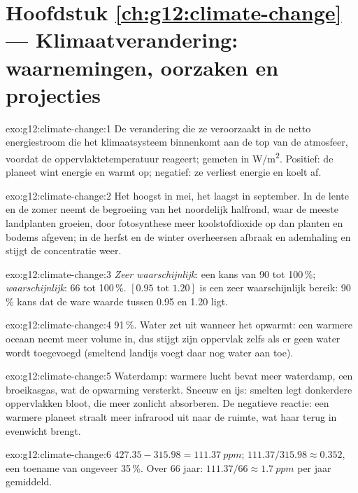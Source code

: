 \section*{Hoofdstuk \ref{ch:g12:climate-change} --- Klimaatverandering: waarnemingen, oorzaken en projecties}

\begin{solution}{exo:g12:climate-change:1}
De verandering die ze veroorzaakt in de netto energiestroom die het klimaatsysteem
binnenkomt aan de top van de atmosfeer, voordat de oppervlaktetemperatuur reageert;
gemeten in \unit{W/m^2}. Positief: de planeet wint energie en warmt op;
negatief: ze verliest energie en koelt af.
\end{solution}

\begin{solution}{exo:g12:climate-change:2}
Het hoogst in mei, het laagst in september. In de lente en de zomer neemt de begroeiing
van het noordelijk halfrond, waar de meeste landplanten groeien, door fotosynthese meer
koolstofdioxide op dan planten en bodems afgeven; in de herfst
en de winter overheersen afbraak en ademhaling en stijgt de concentratie weer.
\end{solution}

\begin{solution}{exo:g12:climate-change:3}
\emph{Zeer waarschijnlijk}: een kans van 90 tot 100\,\%; \emph{waarschijnlijk}: 66 tot
100\,\%. $[0.95 \text{ tot } 1.20]$ is een zeer waarschijnlijk bereik: 90\,\% kans dat
de ware waarde tussen 0.95 en 1.20 ligt.
\end{solution}

\begin{solution}{exo:g12:climate-change:4}
91\,\%. Water zet uit wanneer het opwarmt: een warmere oceaan neemt meer volume in, dus
stijgt zijn oppervlak zelfs als er geen water wordt toegevoegd (smeltend landijs voegt daar
nog water aan toe).
\end{solution}

\begin{solution}{exo:g12:climate-change:5}
Waterdamp: warmere lucht bevat meer waterdamp, een broeikasgas, wat de opwarming
versterkt. Sneeuw en ijs: smelten legt donkerdere oppervlakken bloot, die
meer zonlicht absorberen. De negatieve reactie: een warmere planeet straalt meer infrarood
uit naar de ruimte, wat haar terug in evenwicht brengt.
\end{solution}

\begin{solution}{exo:g12:climate-change:6}
$427.35 - 315.98 = \qty{111.37}{ppm}$; $111.37/315.98 \approx 0.352$, een
toename van ongeveer 35\,\%. Over 66 jaar: $111.37/66 \approx
\qty{1.7}{ppm}$ per jaar gemiddeld.
\end{solution}

